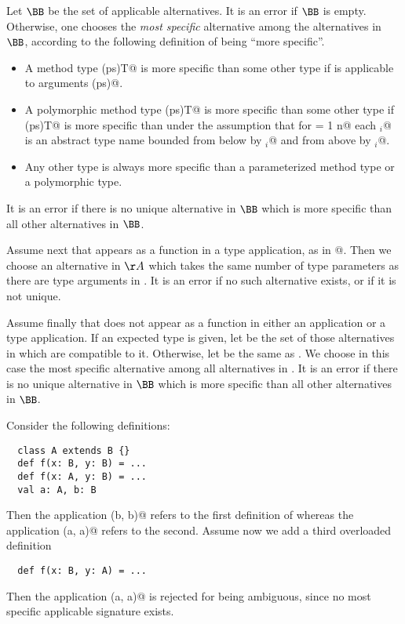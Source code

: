 \documentclass[11pt]{report}
\begin{document}
Let $\BB$ be the set of applicable alternatives. It is an error if
$\BB$ is empty. Otherwise, one chooses the {\em most specific}
alternative among the alternatives in $\BB$, according to the
following definition of being ``more specific''.
\begin{itemize} 
\item
A method type \verb@(ps)T@ is more specific than some other
type \verb@S@ if \verb@S@ is applicable to arguments \verb@(ps)@.
\item
A polymorphic method type
\verb@[a$_1$ >: L$_1$ <: U$_1$, ..., a$_n$ >: L$_n$ <: U$_n$](ps)T@ is
more specific than some other type \verb@S@ if \verb@(ps)T@ is more
specific than \verb@S@ under the assumption that for
\verb@i = 1 \commadots n@ each \verb@a$_i$@ is an abstract type name
bounded from below by \verb@L$_i$@ and from above by \verb@U$_i$@.
\item
Any other type is always more specific than a parameterized method
type or a polymorphic type.
\end{itemize}
It is an error if there is no unique alternative in $\BB$ which is
more specific than all other alternatives in $\BB$.

Assume next that \verb@f@ appears as a function in a type
application, as in \verb@f[targs]@. Then we choose an alternative in
$\AA$ which takes the same number of type parameters as there are
type arguments in \verb@targs@. It is an error if no such alternative
exists, or if it is not unique.

Assume finally that \verb@f@ does not appear as a function in either
an application or a type application. If an expected type is given,
let \verb@BB@ be the set of those alternatives in \verb@AA@ which are
compatible to it. Otherwise, let \verb@BB@ be the same as \verb@AA@.
We choose in this case the most specific alternative among all
alternatives in \verb@BB@. It is an error if there is no unique
alternative in $\BB$ which is more specific than all other
alternatives in $\BB$.

\example Consider the following definitions:

\begin{verbatim}
  class A extends B {}
  def f(x: B, y: B) = ...
  def f(x: A, y: B) = ...
  val a: A, b: B
\end{verbatim}
Then the application \verb@f(b, b)@ refers to the first
definition of \verb@f@ whereas the application \verb@f(a, a)@
refers to the second.  Assume now we add a third overloaded definition
\begin{verbatim}
  def f(x: B, y: A) = ...
\end{verbatim}
Then the application \verb@f(a, a)@ is rejected for being ambiguous, since
no most specific applicable signature exists.
\end{document}
